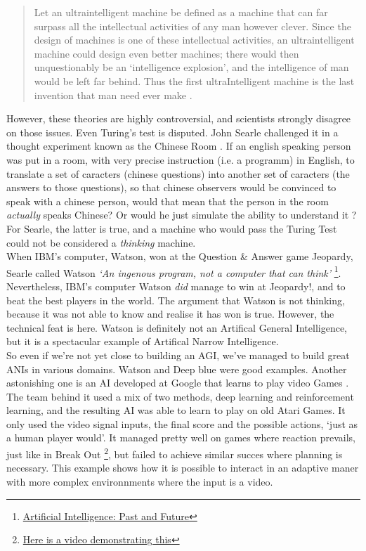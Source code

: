 \documentclass[12pt]{article}
\begin{document}
\smallskip

\begin{quotation}
   Let an ultraintelligent machine be defined as a machine that can far surpass
   all the intellectual activities of any man however clever. Since the design
   of machines is one of these intellectual activities, an ultraintelligent
   machine could design even better machines; there would then unquestionably be
   an \lq intelligence explosion\rq , and the intelligence of man would be left
   far behind. Thus the first ultraIntelligent machine is the last invention
   that man need ever make \cite{Good}.
\end{quotation}

However, these theories are highly controversial, and scientists strongly disagree
on those issues. Even Turing's test is disputed. John Searle challenged it in a
thought experiment known as the Chinese Room \cite{ChineseRoom}. If an english
speaking person was put in a room, with very precise instruction (i.e. a programm)
in English, to translate a set of caracters (chinese questions) into another
set of caracters (the answers to those questions), so that chinese observers would
be convinced to speak with a chinese person, would that mean that the person in the
room {\em actually} speaks Chinese? Or would he just simulate the ability to
understand it ? For Searle, the latter is true, and a machine who would pass the
Turing Test could not be considered a {\em thinking} machine.
\\

When IBM's computer, Watson, won at the Question \& Answer game Jeopardy, Searle
called Watson \textit{\lq  An ingenous program, not a computer that
can think\rq} \footnote{
\href{http://cacm.acm.org/magazines/2012/1/144824-artificial-intelligence-past-and-future/fulltext}
{Artificial Intelligence: Past and Future}}. Nevertheless, IBM's computer Watson
{\em did} manage to win at Jeopardy!, and to beat the best players in the world.
The argument that Watson is not thinking, because it was not able to know and
realise it has won is true. However, the technical feat is here. Watson is
definitely not an Artifical General Intelligence, but it is a spectacular
example of Artifical Narrow Intelligence.
\\

So even if we're not yet close to building an \gls{AGI}, we've managed to build great
\gls{ANI}s in various domains. Watson and Deep blue were good examples. Another
astonishing one is an AI developed at Google that learns to play video Games
\cite{Atari}. The team behind it used a mix of two methods, deep learning and
reinforcement learning, and the resulting AI
was able to learn to play on old Atari Games. It only used the video signal
inputs, the final score and the possible actions, \lq just as a human player
would\rq. It managed pretty well on games where reaction prevails, just like in
Break Out \footnote{\href{https://www.youtube.com/watch?v=cjpEIotvwFY}
{Here is a video demonstrating this}}, but failed to achieve similar succes
where planning is necessary. This example shows how it is possible to interact
in an adaptive maner with more complex environnments where the input is a video.
\\
\end{document}
